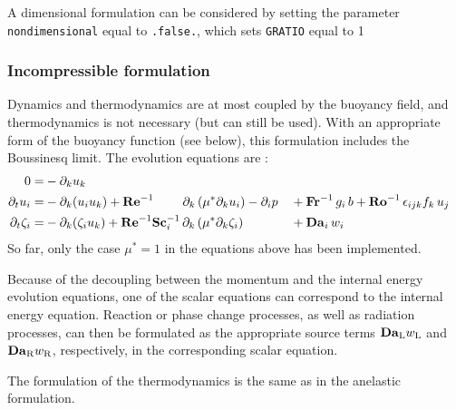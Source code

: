 A dimensional formulation can be considered by setting the parameter \texttt{nondimensional} equal to \texttt{.false.}, which sets \texttt{GRATIO} equal to 1

\subsubsection{Incompressible formulation}

Dynamics and thermodynamics are at most coupled by the buoyancy field, and thermodynamics is not necessary (but can still be used). With an appropriate form of the buoyancy function (see below), this formulation includes the Boussinesq limit. The evolution equations are :
\begin{subequations}
    \begin{align}
        0                   =& -\partial_k u_k                                          \\
        \partial_t  u_i     =& -\partial_k ( u_i u_k )  
        +\mathrm{\bf Re}^{-1}\qquad\;\partial_k \left( \mu^{*} \partial_k u_i\right)  -\partial_i p&&
        +\mathrm{\bf Fr}^{-1}\, g_i\,b +\mathrm{\bf Ro}^{-1}\,\epsilon_{ijk} f_k\,u_j  \\
        \partial_t \zeta_i  =& -\partial_k (\zeta_i u_k)                    
        +\mathrm{\bf Re}^{-1}\mathrm{\bf Sc}_i^{-1}\, \partial_k \left( \mu^{*}\partial_k\zeta_i\right) &&+ \mathrm{\bf Da}_i\,w_i
    \end{align}
\end{subequations}
So far, only the case $\mu^*=1$ in the equations above has been implemented.

Because of the decoupling between the momentum and the internal energy evolution equations, one of the scalar equations can correspond to the internal energy equation. Reaction or phase change processes, as well as radiation processes, can then be formulated as the appropriate source terms $\mathrm{\bf   Da}_\mathrm{L}w_\mathrm{L}$ and $\mathrm{\bf Da}_\mathrm{R}w_\mathrm{R}$, respectively, in the corresponding scalar equation. %

The formulation of the thermodynamics is the same as in the anelastic formulation.

